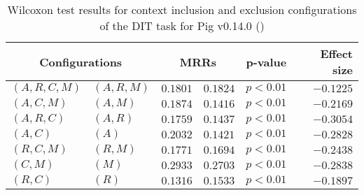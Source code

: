 
\begin{table}
\begin{spacing}{1.2}
\centering
\caption{Wilcoxon test results for context inclusion and exclusion configurations of the DIT task for Pig v0.14.0 (\ctwo)}
\label{table:versus-wilcox-pig-dit-context}
\begin{tabular}{ll|rr|rr}
\toprule
      \multicolumn{2}{c|}{Configurations} &                \multicolumn{2}{c|}{MRRs} &             p-value & Effect size \\
\midrule
 $(A,R,C,M)$ &  $(A,R,M)$ &       $0.1801$ &  $\bm{0.1824}$ & $p<0.01$ &   $-0.1225$ \\
   $(A,C,M)$ &    $(A,M)$ &  $\bm{0.1874}$ &       $0.1416$ & $p<0.01$ &   $-0.2169$ \\
   $(A,R,C)$ &    $(A,R)$ &  $\bm{0.1759}$ &       $0.1437$ & $p<0.01$ &   $-0.3054$ \\
     $(A,C)$ &      $(A)$ &  $\bm{0.2032}$ &       $0.1421$ & $p<0.01$ &   $-0.2828$ \\
   $(R,C,M)$ &    $(R,M)$ &  $\bm{0.1771}$ &       $0.1694$ & $p<0.01$ &   $-0.2438$ \\
     $(C,M)$ &      $(M)$ &  $\bm{0.2933}$ &       $0.2703$ & $p<0.01$ &   $-0.2838$ \\
     $(R,C)$ &      $(R)$ &       $0.1316$ &  $\bm{0.1533}$ & $p<0.01$ &   $-0.1897$ \\
\bottomrule
\end{tabular}

\end{spacing}
\end{table}

